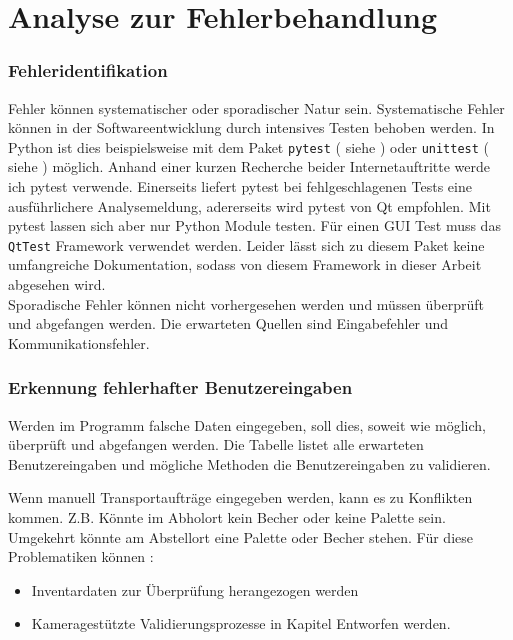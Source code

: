 \chapter{Analyse zur Fehlerbehandlung}\label{Fehlerbehandlung}

\subsection{Fehleridentifikation}

Fehler können systematischer oder sporadischer Natur sein.
Systematische Fehler können in der Softwareentwicklung durch intensives Testen behoben werden.
In Python ist dies beispielsweise mit dem Paket \verb|pytest| ( siehe \cite{pytestHP}) oder \verb|unittest| ( siehe \cite{unittestHP}) möglich.
Anhand einer kurzen Recherche beider Internetauftritte werde ich pytest verwende.
Einerseits liefert pytest bei fehlgeschlagenen Tests eine ausführlichere Analysemeldung, adererseits wird pytest von Qt empfohlen.
Mit pytest lassen sich aber nur Python Module testen.
Für einen GUI Test muss das \verb|QtTest| Framework verwendet werden.
Leider lässt sich zu diesem Paket keine umfangreiche Dokumentation, sodass von diesem Framework in dieser Arbeit abgesehen wird.\\

\vspace{1cm}
Sporadische Fehler können nicht vorhergesehen werden und müssen überprüft und abgefangen werden.
Die erwarteten Quellen sind Eingabefehler und Kommunikationsfehler.

\subsection{Erkennung fehlerhafter Benutzereingaben}

Werden im Programm falsche Daten eingegeben, soll dies, soweit wie möglich, überprüft und abgefangen werden.
Die Tabelle listet alle erwarteten Benutzereingaben und mögliche Methoden die Benutzereingaben
zu validieren.

\vspace{1cm}
Wenn manuell Transportaufträge eingegeben werden, kann es zu Konflikten kommen.
Z.B. Könnte im Abholort kein Becher oder keine Palette sein.
Umgekehrt könnte am Abstellort eine Palette oder Becher stehen.
Für diese Problematiken können :
\begin{itemize}
    \item Inventardaten zur Überprüfung herangezogen werden
    \item Kameragestützte Validierungsprozesse in Kapitel Entworfen werden.
\end{itemize}